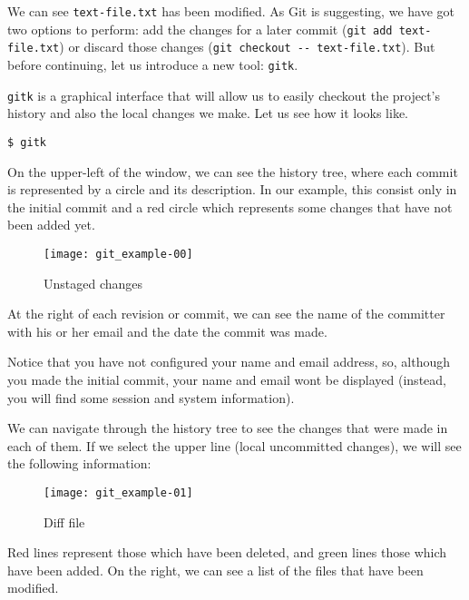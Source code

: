 \documentclass[a4paper,10pt]{article}
\newenvironment{terminal}
  {
    \vspace{+10pt}
    \begin{center}
    \begin{minipage}{0.95\textwidth}
    \begin{framed}
  }
  {
    \end{framed}
    \end{minipage}
    \end{center}
    \vspace{+10pt}
  }
\begin{document}
We can see \texttt{text-file.txt} has been modified. As Git is
suggesting, we have got two options to perform: add the changes for a
later commit (\texttt{git add text-file.txt}) or discard those changes
(\texttt{git checkout -{}- text-file.txt}). But before continuing, let us
introduce a new tool: \texttt{gitk}.

\texttt{gitk} is a graphical interface that will allow us to easily
checkout the project's history and also the local changes we make. Let us
see how it looks like.

\begin{terminal}
\begin{verbatim}
$ gitk
\end{verbatim}
\end{terminal}

On the upper-left of the window, we can see the history tree, where
each commit is represented by a circle and its description. In our
example, this consist only in the initial commit and a red circle which
represents some changes that have not been added yet.

\begin{figure}
  \begin{center}
    \texttt{[image: git\_example-00]}
  \end{center}
  \caption{Unstaged changes}
\end{figure}

At the right of each revision or commit, we can see the name of the
committer with his or her email and the date the commit was made.

\begin{tip}
Notice that you have not configured your name and email address, so,
although you made the initial commit, your name and email wont be
displayed (instead, you will find some session and system information).
\end{tip}

We can navigate through the history tree to see the changes that were
made in each of them. If we select the upper line (local uncommitted
changes), we will see the following information:

\begin{figure}
  \begin{center}
    \texttt{[image: git\_example-01]}
  \end{center}
  \caption{Diff file}
\end{figure}

Red lines represent those which have been deleted, and green lines those
which have been added. On the right, we can see a list of the files
that have been modified.
\end{document}
